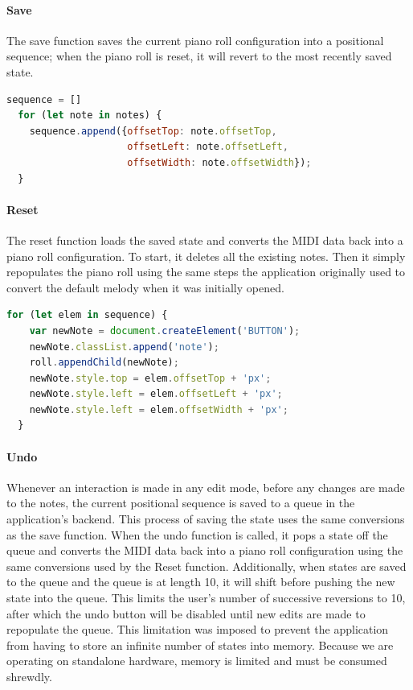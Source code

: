 \paragraph{Save}

The save function saves the current piano roll configuration into a positional sequence; when the
piano roll is reset, it will revert to the most recently saved state.

\begin{lstlisting}[language=JavaScript, label={lst:note_to_seq}, caption={Reading the piano roll configuration into a positional sequence}]
  sequence = []
  for (let note in notes) {
    sequence.append({offsetTop: note.offsetTop,
                     offsetLeft: note.offsetLeft,
                     offsetWidth: note.offsetWidth});
  }
\end{lstlisting}

\paragraph{Reset}

The reset function loads the saved state and converts the MIDI data back into a piano roll
configuration. To start, it deletes all the existing notes. Then it simply repopulates the piano
roll using the same steps the application originally used to convert the default melody when it was
initially opened.

\begin{lstlisting}[language=JavaScript, label={lst:seq_to_note}, caption={Generating a piano roll configuration from a positional sequence}]
  for (let elem in sequence) {
    var newNote = document.createElement('BUTTON');
    newNote.classList.append('note');
    roll.appendChild(newNote);
    newNote.style.top = elem.offsetTop + 'px';
    newNote.style.left = elem.offsetLeft + 'px';
    newNote.style.left = elem.offsetWidth + 'px';
  }
\end{lstlisting}

\paragraph{Undo}

Whenever an interaction is made in any edit mode, before any changes are made to the notes, the
current positional sequence is saved to a queue in the application’s backend. This process of
saving the state uses the same conversions as the save function. When the undo function is called,
it pops a state off the queue and converts the MIDI data back into a piano roll configuration using
the same conversions used by the Reset function. Additionally, when states are saved to the queue
and the queue is at length 10, it will shift before pushing the new state into the queue. This
limits the user’s number of successive reversions to 10, after which the undo button will be
disabled until new edits are made to repopulate the queue. This limitation was imposed to prevent
the application from having to store an infinite number of states into memory. Because we are
operating on standalone hardware, memory is limited and must be consumed shrewdly.

